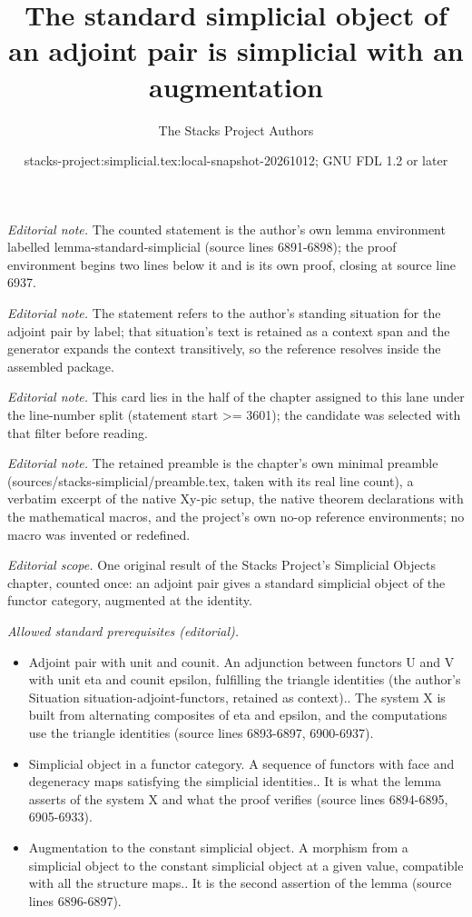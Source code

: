 \documentclass{stacks-project}
\title{The standard simplicial object of an adjoint pair is simplicial with an augmentation}
\author{The Stacks Project Authors}
\date{stacks-project:simplicial.tex:local-snapshot-20261012; GNU FDL 1.2 or later}
\theoremstyle{plain}
\theoremstyle{definition}
\theoremstyle{remark}
\numberwithin{equation}{subsection}
\begin{document}
\maketitle
\noindent\textit{Editorial note.} The counted statement is the author's own lemma environment labelled lemma-standard-simplicial (source lines 6891-6898); the proof environment begins two lines below it and is its own proof, closing at source line 6937.\par\medskip
\noindent\textit{Editorial note.} The statement refers to the author's standing situation for the adjoint pair by label; that situation's text is retained as a context span and the generator expands the context transitively, so the reference resolves inside the assembled package.\par\medskip
\noindent\textit{Editorial note.} This card lies in the half of the chapter assigned to this lane under the line-number split (statement start >= 3601); the candidate was selected with that filter before reading.\par\medskip
\noindent\textit{Editorial note.} The retained preamble is the chapter's own minimal preamble (sources/stacks-simplicial/preamble.tex, taken with its real line count), a verbatim excerpt of the native Xy-pic setup, the native theorem declarations with the mathematical macros, and the project's own no-op reference environments; no macro was invented or redefined.\par\medskip
\noindent\textit{Editorial scope.} One original result of the Stacks Project's Simplicial Objects chapter, counted once: an adjoint pair gives a standard simplicial object of the functor category, augmented at the identity.\par\medskip
\noindent\textit{Allowed standard prerequisites (editorial).}\begin{itemize}
\item Adjoint pair with unit and counit. An adjunction between functors U and V with unit eta and counit epsilon, fulfilling the triangle identities (the author's Situation situation-adjoint-functors, retained as context).. The system X is built from alternating composites of eta and epsilon, and the computations use the triangle identities (source lines 6893-6897, 6900-6937).
\item Simplicial object in a functor category. A sequence of functors with face and degeneracy maps satisfying the simplicial identities.. It is what the lemma asserts of the system X and what the proof verifies (source lines 6894-6895, 6905-6933).
\item Augmentation to the constant simplicial object. A morphism from a simplicial object to the constant simplicial object at a given value, compatible with all the structure maps.. It is the second assertion of the lemma (source lines 6896-6897).
\end{itemize}\medskip
\end{document}
